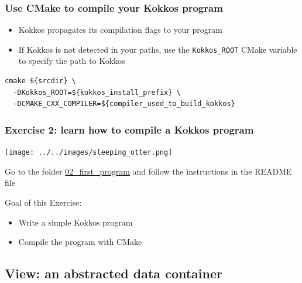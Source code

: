 \documentclass[aspectratio=169]{beamer}
\begin{document}
\begin{frame}[fragile]

\frametitle{Use CMake to compile your Kokkos program}

\begin{itemize}
    \item Kokkos propagates its compilation flags to your program
    \item If Kokkos is not detected in your paths, use the \texttt{Kokkos\_ROOT} CMake variable to specify the path to Kokkos
\end{itemize}

\small
\begin{verbatim}
cmake ${srcdir} \
  -DKokkos_ROOT=${kokkos_install_prefix} \
  -DCMAKE_CXX_COMPILER=${compiler_used_to_build_kokkos}
\end{verbatim}

\end{frame}


\begin{frame}[fragile]
    \frametitle{Exercise 2: learn how to compile a Kokkos program} 

    \begin{center}
    \texttt{[image: ../../images/sleeping\_otter.png]}
    \end{center}

    Go to the folder \href{https://github.com/CExA-project/cexa-kokkos-tutorials/tree/main/exercises/02_first_program}{02\_first\_program} and follow the instructions in the README file

    Goal of this Exercise:

    \begin{itemize}
        \item Write a simple Kokkos program
        \item Compile the program with CMake
    \end{itemize}

\end{frame}



\subsection[Data container]{View: an abstracted data container}
\end{document}
